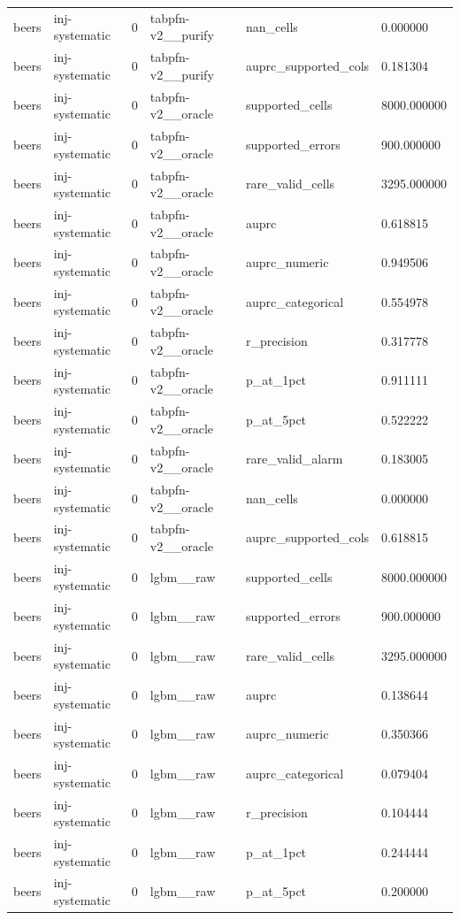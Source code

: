\begin{tabular}{llllll}
beers & inj-systematic & 0 & tabpfn-v2\_\_purify & nan\_cells & 0.000000 \\
beers & inj-systematic & 0 & tabpfn-v2\_\_purify & auprc\_supported\_cols & 0.181304 \\
beers & inj-systematic & 0 & tabpfn-v2\_\_oracle & supported\_cells & 8000.000000 \\
beers & inj-systematic & 0 & tabpfn-v2\_\_oracle & supported\_errors & 900.000000 \\
beers & inj-systematic & 0 & tabpfn-v2\_\_oracle & rare\_valid\_cells & 3295.000000 \\
beers & inj-systematic & 0 & tabpfn-v2\_\_oracle & auprc & 0.618815 \\
beers & inj-systematic & 0 & tabpfn-v2\_\_oracle & auprc\_numeric & 0.949506 \\
beers & inj-systematic & 0 & tabpfn-v2\_\_oracle & auprc\_categorical & 0.554978 \\
beers & inj-systematic & 0 & tabpfn-v2\_\_oracle & r\_precision & 0.317778 \\
beers & inj-systematic & 0 & tabpfn-v2\_\_oracle & p\_at\_1pct & 0.911111 \\
beers & inj-systematic & 0 & tabpfn-v2\_\_oracle & p\_at\_5pct & 0.522222 \\
beers & inj-systematic & 0 & tabpfn-v2\_\_oracle & rare\_valid\_alarm & 0.183005 \\
beers & inj-systematic & 0 & tabpfn-v2\_\_oracle & nan\_cells & 0.000000 \\
beers & inj-systematic & 0 & tabpfn-v2\_\_oracle & auprc\_supported\_cols & 0.618815 \\
beers & inj-systematic & 0 & lgbm\_\_raw & supported\_cells & 8000.000000 \\
beers & inj-systematic & 0 & lgbm\_\_raw & supported\_errors & 900.000000 \\
beers & inj-systematic & 0 & lgbm\_\_raw & rare\_valid\_cells & 3295.000000 \\
beers & inj-systematic & 0 & lgbm\_\_raw & auprc & 0.138644 \\
beers & inj-systematic & 0 & lgbm\_\_raw & auprc\_numeric & 0.350366 \\
beers & inj-systematic & 0 & lgbm\_\_raw & auprc\_categorical & 0.079404 \\
beers & inj-systematic & 0 & lgbm\_\_raw & r\_precision & 0.104444 \\
beers & inj-systematic & 0 & lgbm\_\_raw & p\_at\_1pct & 0.244444 \\
beers & inj-systematic & 0 & lgbm\_\_raw & p\_at\_5pct & 0.200000 \\

\end{tabular}
